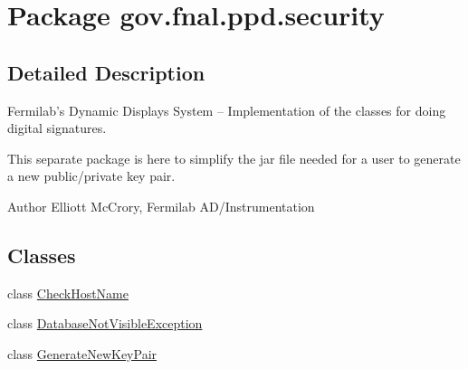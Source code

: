 \hypertarget{namespacegov_1_1fnal_1_1ppd_1_1security}{\section{Package gov.\-fnal.\-ppd.\-security}
\label{namespacegov_1_1fnal_1_1ppd_1_1security}
}


\subsection{Detailed Description}
Fermilab's Dynamic Displays System -- Implementation of the classes for doing digital signatures. 

This separate package is here to simplify the jar file needed for a user to generate a new public/private key pair. 

\begin{DoxyAuthor}{Author}
Elliott Mc\-Crory, Fermilab A\-D/\-Instrumentation 
\end{DoxyAuthor}
\subsection*{Classes}
\begin{DoxyCompactItemize}
\item 
class \hyperlink{classgov_1_1fnal_1_1ppd_1_1security_1_1CheckHostName}{Check\-Host\-Name}
\item 
class \hyperlink{classgov_1_1fnal_1_1ppd_1_1security_1_1DatabaseNotVisibleException}{Database\-Not\-Visible\-Exception}
\item 
class \hyperlink{classgov_1_1fnal_1_1ppd_1_1security_1_1GenerateNewKeyPair}{Generate\-New\-Key\-Pair}
\end{DoxyCompactItemize}
